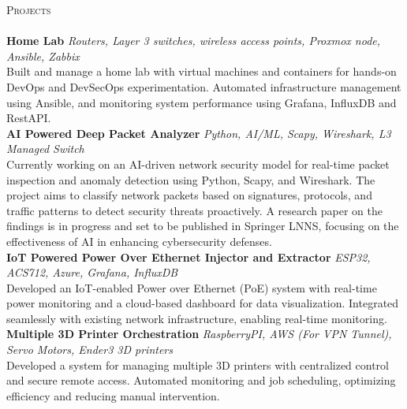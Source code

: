 \documentclass[a4paper]{article}
\newcommand{\lineunder} {
    \vspace*{-8pt} \\
    \hspace*{-18pt} \hrulefill \\
}
\newcommand{\header} [1] {
    {\hspace*{-18pt}\vspace*{6pt} \textsc{#1}}
    \vspace*{-6pt} \lineunder
}
\begin{document}
\header{Projects}
{\textbf{Home Lab}} {\sl Routers, Layer 3 switches, wireless access points, Proxmox node, Ansible, Zabbix} \\
Built and manage a home lab with virtual machines and containers for hands-on DevOps and DevSecOps experimentation. Automated infrastructure management using Ansible, and monitoring system performance using Grafana, InfluxDB and RestAPI.\\
\vspace*{2mm}
{\textbf{AI Powered Deep Packet Analyzer}} {\sl Python, AI/ML, Scapy, Wireshark, L3 Managed Switch} \\
Currently working on an AI-driven network security model for real-time packet inspection and anomaly detection using Python, Scapy, and Wireshark. The project aims to classify network packets based on signatures, protocols, and traffic patterns to detect security threats proactively. A research paper on the findings is in progress and set to be published in Springer LNNS, focusing on the effectiveness of AI in enhancing cybersecurity defenses.\\
\vspace*{2mm}
{\textbf{IoT Powered Power Over Ethernet Injector and Extractor}} {\sl ESP32, ACS712, Azure, Grafana, InfluxDB} \\
Developed an IoT-enabled Power over Ethernet (PoE) system with real-time power monitoring and a cloud-based dashboard for data visualization. Integrated seamlessly with existing network infrastructure, enabling real-time monitoring.\\
\vspace*{2mm}
{\textbf{Multiple 3D Printer Orchestration}} {\sl RaspberryPI, AWS (For VPN Tunnel), Servo Motors, Ender3 3D printers} \\
Developed a system for managing multiple 3D printers with centralized control and secure remote access. Automated monitoring and job scheduling, optimizing efficiency and reducing manual intervention.\\
\vspace*{2mm}



\ 
\end{document}
